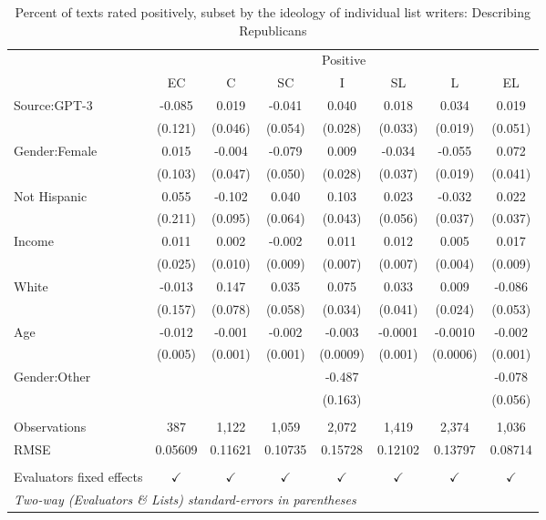 \documentclass[11pt]{article}
\begin{document}
\begin{table}
\centering
%
\begin{tabular}{lccccccc}
\toprule
&\multicolumn{7}{c}{Positive}\\
& EC & C & SC & I & SL & L & EL\\
\midrule Source:GPT-3&-0.085 & 0.019 & -0.041 & 0.040 & 0.018 & 0.034 & 0.019\\
  &(0.121) & (0.046) & (0.054) & (0.028) & (0.033) & (0.019) & (0.051)\\
Gender:Female&0.015 & -0.004 & -0.079 & 0.009 & -0.034 & -0.055 & 0.072\\
  &(0.103) & (0.047) & (0.050) & (0.028) & (0.037) & (0.019) & (0.041)\\
Not Hispanic&0.055 & -0.102 & 0.040 & 0.103 & 0.023 & -0.032 & 0.022\\
  &(0.211) & (0.095) & (0.064) & (0.043) & (0.056) & (0.037) & (0.037)\\
Income&0.011 & 0.002 & -0.002 & 0.011 & 0.012 & 0.005 & 0.017\\
  &(0.025) & (0.010) & (0.009) & (0.007) & (0.007) & (0.004) & (0.009)\\
White&-0.013 & 0.147 & 0.035 & 0.075 & 0.033 & 0.009 & -0.086\\
  &(0.157) & (0.078) & (0.058) & (0.034) & (0.041) & (0.024) & (0.053)\\
Age&-0.012 & -0.001 & -0.002 & -0.003 & -0.0001 & -0.0010 & -0.002\\
  &(0.005) & (0.001) & (0.001) & (0.0009) & (0.001) & (0.0006) & (0.001)\\
Gender:Other&   &    &    & -0.487 &    &    & -0.078\\
  &   &    &    & (0.163) &    &    & (0.056)\\
 &  & & & & & & \\
Observations & 387&1,122&1,059&2,072&1,419&2,374&1,036\\
RMSE & 0.05609&0.11621&0.10735&0.15728&0.12102&0.13797&0.08714\\
 &   &   &   &   &   &   &  \\
Evaluators fixed effects & $\checkmark$ & $\checkmark$ & $\checkmark$ & $\checkmark$ & $\checkmark$ & $\checkmark$ & $\checkmark$\\
\bottomrule
\multicolumn{8}{l}{\emph{Two-way (Evaluators \& Lists) standard-errors in parentheses}}\\
\end{tabular}
%
\caption{Percent of texts rated positively, subset by the ideology of individual list writers: Describing Republicans}
\label{tab:f4a1}
\end{table}
\end{document}
